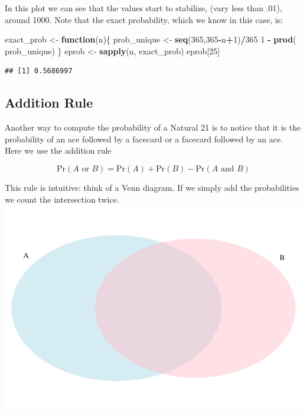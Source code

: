 \documentclass[
  openany]{book}
\newenvironment{Shaded}{\begin{snugshade}}{\end{snugshade}}
\newcommand{\ControlFlowTok}[1]{\textcolor[rgb]{0.13,0.29,0.53}{\textbf{#1}}}
\newcommand{\DecValTok}[1]{\textcolor[rgb]{0.00,0.00,0.81}{#1}}
\newcommand{\KeywordTok}[1]{\textcolor[rgb]{0.13,0.29,0.53}{\textbf{#1}}}
\newcommand{\NormalTok}[1]{#1}
\newcommand{\OperatorTok}[1]{\textcolor[rgb]{0.81,0.36,0.00}{\textbf{#1}}}
\newcommand{\StringTok}[1]{\textcolor[rgb]{0.31,0.60,0.02}{#1}}
\begin{document}
In this plot we can see that the values start to stabilize, (vary less than .01), around 1000. Note that the exact probability, which we know in this case, is:

\begin{Shaded}
\begin{Highlighting}[]
\NormalTok{exact_prob <-}\StringTok{ }\ControlFlowTok{function}\NormalTok{(n)\{}
\NormalTok{  prob_unique <-}\StringTok{ }\KeywordTok{seq}\NormalTok{(}\DecValTok{365}\NormalTok{,}\DecValTok{365}\OperatorTok{-}\NormalTok{n}\OperatorTok{+}\DecValTok{1}\NormalTok{)}\OperatorTok{/}\DecValTok{365}
  \DecValTok{1} \OperatorTok{-}\StringTok{ }\KeywordTok{prod}\NormalTok{( prob_unique)}
\NormalTok{\}}
\NormalTok{eprob <-}\StringTok{ }\KeywordTok{sapply}\NormalTok{(n, exact_prob)}
\NormalTok{eprob[}\DecValTok{25}\NormalTok{]}
\end{Highlighting}
\end{Shaded}

\begin{verbatim}
## [1] 0.5686997
\end{verbatim}

\hypertarget{addition-rule}{%
\subsection{Addition Rule}\label{addition-rule}}

Another way to compute the probability of a Natural 21 is to notice that it is the probability of an ace followed by a facecard or a facecard followed by an ace. Here we use the addition rule

\[
\mbox{Pr}(A \mbox{ or } B) = \mbox{Pr}(A) + \mbox{Pr}(B) - \mbox{Pr}(A \mbox{ and } B)
\]

This rule is intuitive: think of a Venn diagram. If we simply add the probabilities we count the intersection twice.
\includegraphics{DataSciLibArts_files/figure-latex/unnamed-chunk-51-1.pdf}
\end{document}
